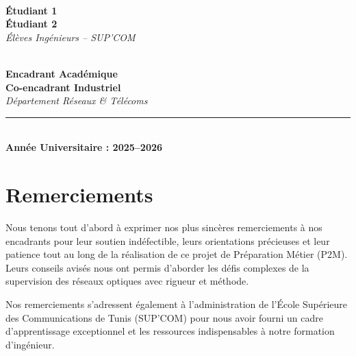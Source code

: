 \documentclass[11pt,a4paper]{article}
\begin{document}
\begin{titlepage}
    \begin{minipage}[t]{0.45\textwidth}
        \flushleft
        \textbf{\color{slate-navy}{Réalisé par :}}\\
        \vspace{0.2cm}
        {\large\textbf{Étudiant 1}} \\
        {\large\textbf{Étudiant 2}} \\
        \vspace{0.1cm}
        \textit{Élèves Ingénieurs -- SUP'COM}
    \end{minipage}
    \hfill
    \begin{minipage}[t]{0.45\textwidth}
        \flushright
        \textbf{\color{slate-navy}{Encadré par :}}\\
        \vspace{0.2cm}
        {\large\textbf{Encadrant Académique}} \\
        {\large\textbf{Co-encadrant Industriel}} \\
        \vspace{0.1cm}
        \textit{Département Réseaux \& Télécoms}
    \end{minipage}
    
    \vfill
    
    \textcolor{teal-accent}{\rule{10cm}{0.5pt}} \\
    \vspace{0.3cm}
    {\large\textbf{Année Universitaire : 2025--2026}}
\end{titlepage}

\newpage
{}
\setcounter{page}{1}

\section*{Remerciements}
Nous tenons tout d'abord à exprimer nos plus sincères remerciements à nos encadrants pour leur soutien indéfectible, leurs orientations précieuses et leur patience tout au long de la réalisation de ce projet de Préparation Métier (P2M). Leurs conseils avisés nous ont permis d'aborder les défis complexes de la supervision des réseaux optiques avec rigueur et méthode.

Nos remerciements s'adressent également à l'administration de l'École Supérieure des Communications de Tunis (SUP'COM) pour nous avoir fourni un cadre d'apprentissage exceptionnel et les ressources indispensables à notre formation d'ingénieur. 
\end{document}
